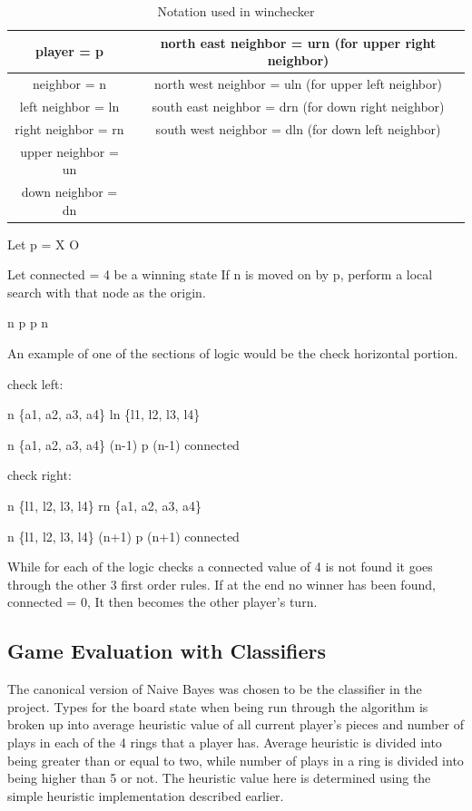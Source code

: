 \documentclass[12pt,letterpaper]{article}
\begin{document}
\begin{table}[h]
\begin{center}
\begin{tabular}{|c||c|}
\hline
player = p & north east neighbor = urn 
(for upper right neighbor)\\
\hline 
neighbor = n & north west neighbor = uln
(for upper left neighbor)\\
\hline 
left neighbor = ln & south east neighbor = drn
(for down right neighbor)\\
\hline 
right neighbor = rn & south west neighbor = dln
(for down left neighbor)\\
\hline 
upper neighbor = un & \\
\hline 
down neighbor = dn & \\
\hline 
\end{tabular}
\end{center}
\caption{Notation used in winchecker}
\label{Notation}
\end{table}

Let p = X \bigoplus O

Let connected = 4 be a winning state If n is moved on by p, perform a local search with that node as the origin.

\exists n \ni p  \bigwedge p \in n

An example of one of the sections of logic would be the check horizontal portion.

check left:

n \in \{a1, a2, a3, a4\} \Rightarrow ln \in \{l1, l2, l3, l4\}



\neg n \in \{a1, a2, a3, a4\} \bigwedge (n-1)  \bigwedge p \in (n-1) \Rightarrow connected

check right:

n \in \{l1, l2, l3, l4\} \Rightarrow rn \in \{a1, a2, a3, a4\}

\neg n \in \{l1, l2, l3, l4\} \bigwedge (n+1)  \bigwedge p \in (n+1) \Rightarrow connected \newline

While for each of the logic checks a connected value of 4 is not found it goes through the other 3 first order rules. If at the end no winner has been found, connected = 0, It then becomes the other player’s turn.

\subsection{Game Evaluation with Classifiers}
The canonical version of Naive Bayes was chosen to be the classifier in the project. Types for the board state when being run through the algorithm is broken up into average heuristic value of all current player’s pieces and number of plays in each of the 4 rings that a player has. Average heuristic is divided into being greater than or equal to two, while number of plays in a ring is divided into being higher than 5 or not. The heuristic value here is determined using the simple heuristic implementation described earlier.
\end{document}
